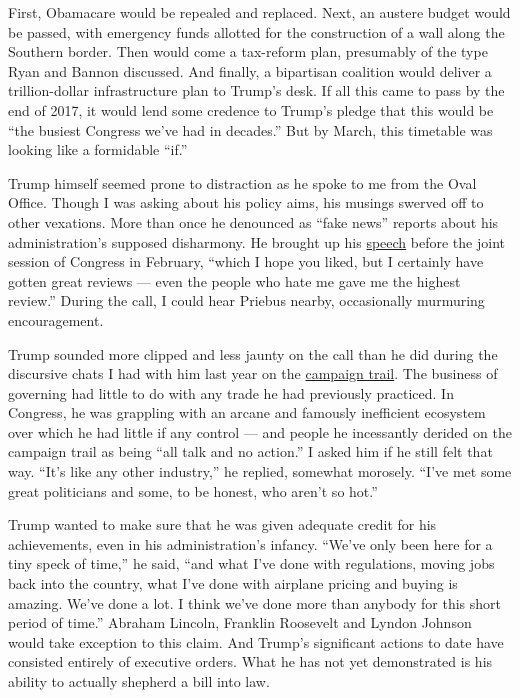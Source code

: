 First, Obamacare would be repealed and replaced. Next, an austere budget
would be passed, with emergency funds allotted for the construction of a
wall along the Southern border. Then would come a tax-reform plan,
presumably of the type Ryan and Bannon discussed. And finally, a
bipartisan coalition would deliver a trillion-dollar infrastructure plan
to Trump's desk. If all this came to pass by the end of 2017, it would
lend some credence to Trump's pledge that this would be ``the busiest
Congress we've had in decades.'' But by March, this timetable was
looking like a formidable ``if.''

Trump himself seemed prone to distraction as he spoke to me from the
Oval Office. Though I was asking about his policy aims, his musings
swerved off to other vexations. More than once he denounced as ``fake
news'' reports about his administration's supposed disharmony. He
brought up his
\href{https://www.nytimes3xbfgragh.onion/2017/02/28/us/politics/trump-address-congress.html}{speech}
before the joint session of Congress in February, ``which I hope you
liked, but I certainly have gotten great reviews --- even the people who
hate me gave me the highest review.'' During the call, I could hear
Priebus nearby, occasionally murmuring encouragement.

Trump sounded more clipped and less jaunty on the call than he did
during the discursive chats I had with him last year on the
\href{https://www.nytimes3xbfgragh.onion/2016/05/22/magazine/donald-trump-primary-win.html}{campaign
trail}. The business of governing had little to do with any trade he had
previously practiced. In Congress, he was grappling with an arcane and
famously inefficient ecosystem over which he had little if any control
--- and people he incessantly derided on the campaign trail as being
``all talk and no action.'' I asked him if he still felt that way.
``It's like any other industry,'' he replied, somewhat morosely. ``I've
met some great politicians and some, to be honest, who aren't so hot.''

Trump wanted to make sure that he was given adequate credit for his
achievements, even in his administration's infancy. ``We've only been
here for a tiny speck of time,'' he said, ``and what I've done with
regulations, moving jobs back into the country, what I've done with
airplane pricing and buying is amazing. We've done a lot. I think we've
done more than anybody for this short period of time.'' Abraham Lincoln,
Franklin Roosevelt and Lyndon Johnson would take exception to this
claim. And Trump's significant actions to date have consisted entirely
of executive orders. What he has not yet demonstrated is his ability to
actually shepherd a bill into law.

